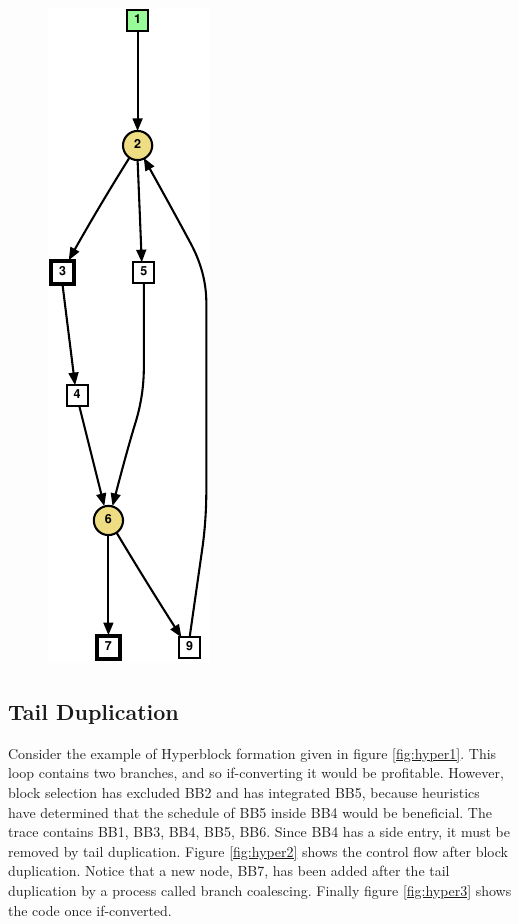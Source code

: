\begin{figure}
{    \includegraphics[scale=0.6]{graph7}
    \label{fig:wc2}}
\label{fig:wc example}
\end{figure}

\subsection{Tail Duplication}

Consider the example of Hyperblock formation given in figure \ref{fig:hyper1}. This loop contains two branches, and so if-converting it would be profitable. However, block selection has excluded BB2 and has integrated BB5, because heuristics have determined that the schedule of BB5 inside BB4 would be beneficial. The trace contains {BB1, BB3, BB4, BB5, BB6}. Since BB4 has a side entry, it must be removed by tail duplication. Figure \ref{fig:hyper2} shows the control flow after block duplication. Notice that a new node, BB7, has been added after the tail duplication by a process called branch coalescing. Finally figure \ref{fig:hyper3} shows the code once if-converted.

